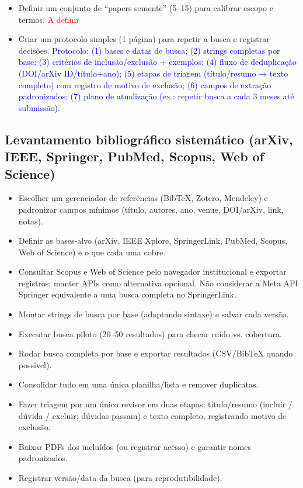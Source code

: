 \documentclass[11pt]{article}
\begin{document}
\begin{itemize}
  \item [ ] Definir um conjunto de ``papers semente'' (5--15) para calibrar escopo e termos. \textcolor{red}{A definir}
  \item [ ] Criar um protocolo simples (1 página) para repetir a busca e registrar decisões. \textcolor{blue}{Protocolo: (1) bases e datas de busca; (2) strings completas por base; (3) critérios de inclusão/exclusão + exemplos; (4) fluxo de deduplicação (DOI/arXiv ID/título+ano); (5) etapas de triagem (título/resumo → texto completo) com registro de motivo de exclusão; (6) campos de extração padronizados; (7) plano de atualização (ex.: repetir busca a cada 3 meses até submissão).}
\end{itemize}

\subsection{Levantamento bibliográfico sistemático (arXiv, IEEE, Springer, PubMed, Scopus, Web of Science)}
\begin{itemize}
  \item [ ] Escolher um gerenciador de referências (Bib\TeX{}, Zotero, Mendeley) e padronizar campos mínimos (título, autores, ano, venue, DOI/arXiv, link, notas).
  \item [ ] Definir as bases-alvo (arXiv, IEEE Xplore, SpringerLink, PubMed, Scopus, Web of Science) e o que cada uma cobre.
  \item [ ] Consultar Scopus e Web of Science pelo navegador institucional e exportar registros; manter APIs como alternativa opcional. Não considerar a Meta API Springer equivalente a uma busca completa no SpringerLink.
  \item [ ] Montar strings de busca por base (adaptando sintaxe) e salvar cada versão.
  \item [ ] Executar busca piloto (20--50 resultados) para checar ruído vs. cobertura.
  \item [ ] Rodar busca completa por base e exportar resultados (CSV/Bib\TeX{} quando possível).
  \item [ ] Consolidar tudo em uma única planilha/lista e remover duplicatas.
  \item [ ] Fazer triagem por um único revisor em duas etapas: título/resumo (incluir / dúvida / excluir; dúvidas passam) e texto completo, registrando motivo de exclusão.
  \item [ ] Baixar PDFs dos incluídos (ou registrar acesso) e garantir nomes padronizados.
  \item [ ] Registrar versão/data da busca (para reprodutibilidade).
\end{itemize}
\end{document}
